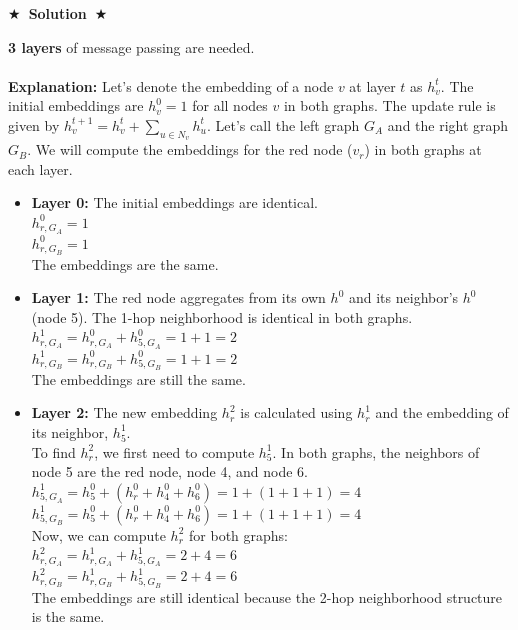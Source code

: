 \documentclass{article}
\numberwithin{figure}{section}
\newcommand{\Solution}[1]{%
	{%
		\medskip
		\color{red}
		\bf $\bigstar$~\sf\textbf{Solution}~$\bigstar$ \sf
		#1
	}
	\bigskip
}
\begin{document}
	
	\Solution{
		\textbf{3 layers} of message passing are needed.
		\\\\
		\textbf{Explanation:}
		Let's denote the embedding of a node $v$ at layer $t$ as $h^t_v$. The initial embeddings are $h^0_v = 1$ for all nodes $v$ in both graphs. The update rule is given by $h^{t+1}_v = h^t_v + \sum_{u \in N_v} h^t_u$. Let's call the left graph $G_A$ and the right graph $G_B$. We will compute the embeddings for the red node ($v_r$) in both graphs at each layer.
		
		\begin{itemize}
			\item \textbf{Layer 0:} The initial embeddings are identical.
			\\ $h^0_{r, G_A} = 1$
			\\ $h^0_{r, G_B} = 1$
			\\ The embeddings are the same.
			
			\item \textbf{Layer 1:} The red node aggregates from its own $h^0$ and its neighbor's $h^0$ (node 5). The 1-hop neighborhood is identical in both graphs.
			\\ $h^1_{r, G_A} = h^0_{r, G_A} + h^0_{5, G_A} = 1 + 1 = 2$
			\\ $h^1_{r, G_B} = h^0_{r, G_B} + h^0_{5, G_B} = 1 + 1 = 2$
			\\ The embeddings are still the same.
			
			\item \textbf{Layer 2:} The new embedding $h^2_r$ is calculated using $h^1_r$ and the embedding of its neighbor, $h^1_5$.
			\\ To find $h^2_r$, we first need to compute $h^1_5$. In both graphs, the neighbors of node 5 are the red node, node 4, and node 6.
			\\ $h^1_{5, G_A} = h^0_5 + (h^0_r + h^0_4 + h^0_6) = 1 + (1+1+1) = 4$
			\\ $h^1_{5, G_B} = h^0_5 + (h^0_r + h^0_4 + h^0_6) = 1 + (1+1+1) = 4$
			\\ Now, we can compute $h^2_r$ for both graphs:
			\\ $h^2_{r, G_A} = h^1_{r, G_A} + h^1_{5, G_A} = 2 + 4 = 6$
			\\ $h^2_{r, G_B} = h^1_{r, G_B} + h^1_{5, G_B} = 2 + 4 = 6$
			\\ The embeddings are still identical because the 2-hop neighborhood structure is the same.
			

\end{itemize}}
\end{document}
